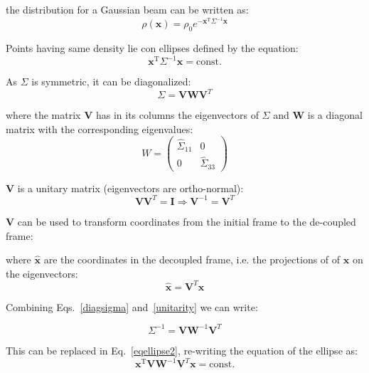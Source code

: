 the distribution for a Gaussian beam can be written as:
\begin{equation}
\rho(\textbf{x}) = \rho_0 e^{-\textbf{x}^{\mathrm{T}} \Sigma^{-1}\textbf{x}}
\end{equation}

Points having same density lie con ellipses defined by the equation:
\begin{equation}
\textbf{x}^\mathrm{T}\Sigma^{-1}\textbf{x} = \mathrm{const.}
\label{eqellipse2}
\end{equation}

As $\Sigma$ is symmetric, it can be diagonalized:
\begin{equation}
\Sigma = \textbf{V} \textbf{W} \textbf{V}^{T}
\label{diagsigma}
\end{equation}

where the matrix $\textbf{V}$ has in its columns the eigenvectors of $\Sigma$ and $\textbf{W}$ is a diagonal matrix with the corresponding eigenvalues:
\begin{equation}
W = \left(
\begin{matrix}
\hat{\Sigma}_{11} & 0\\
0 & \hat{\Sigma}_{33}
\end{matrix}
\right)
\end{equation}

 $\textbf{V}$ is a unitary matrix (eigenvectors are ortho-normal):
\begin{equation}
\textbf{V} \textbf{V}^{T} = \textbf{I} \Rightarrow \textbf{V}^{-1} = \textbf{V}^{T}
\label{unitarity}
\end{equation}

\textbf{V} can be used to transform coordinates from the initial frame to the de-coupled frame:

where $\hat{\textbf{x}}$ are the coordinates in the decoupled frame, i.e. the projections of of $\textbf{x}$ on the eigenvectors:
\begin{equation}
\hat{\textbf{x}}= \textbf{V}^{T}\textbf{x}
\label{vartransform}
\end{equation}

Combining Eqs.~\ref{diagsigma} and~\ref{unitarity} we can write:

\begin{equation}
\Sigma^{-1} = \textbf{V} \textbf{W}^{-1} \textbf{V}^{T}
\end{equation}

This can be replaced in Eq.~\ref{eqellipse2}, re-writing the equation of the ellipse as:
\begin{equation}
\textbf{x}^\mathrm{T}\textbf{V} \textbf{W}^{-1} \textbf{V}^{T}\textbf{x} = \mathrm{const.}
\end{equation}

